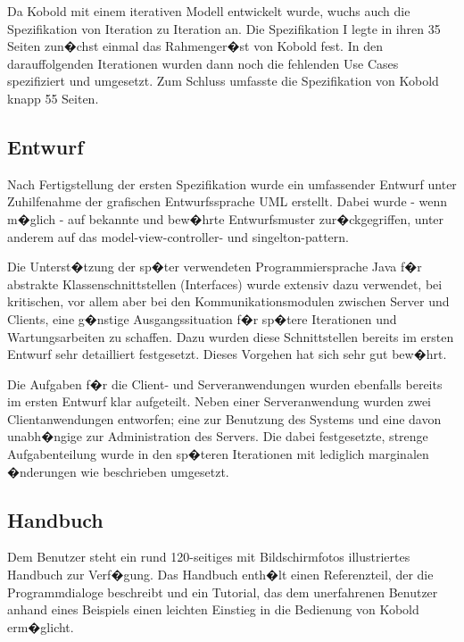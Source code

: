 \documentclass[a4paper,titlepage,12pt,ngerman]{scrbook}
\begin{document}
Da Kobold mit einem iterativen Modell entwickelt wurde, wuchs auch die Spezifikation 
von Iteration zu Iteration an. Die Spezifikation I legte in ihren 35 Seiten zun�chst 
einmal das Rahmenger�st von Kobold fest. In den darauffolgenden Iterationen wurden 
dann noch die fehlenden Use Cases spezifiziert und umgesetzt. Zum Schluss umfasste 
die Spezifikation von Kobold knapp 55 Seiten.

\subsection{Entwurf}

Nach Fertigstellung der ersten Spezifikation wurde ein umfassender Entwurf unter
Zuhilfenahme der grafischen Entwurfssprache UML erstellt. Dabei wurde - wenn
m�glich - auf bekannte und bew�hrte Entwurfsmuster zur�ckgegriffen, unter anderem
auf das model-view-controller- und singelton-pattern.\par

Die Unterst�tzung der sp�ter verwendeten Programmiersprache Java f�r abstrakte
Klassenschnittstellen (Interfaces) wurde extensiv dazu verwendet, bei kritischen, vor
allem aber bei den Kommunikationsmodulen zwischen Server und Clients, eine g�nstige
Ausgangssituation f�r sp�tere Iterationen und Wartungsarbeiten zu schaffen. Dazu wurden
diese Schnittstellen bereits im ersten Entwurf sehr detailliert festgesetzt. Dieses
Vorgehen hat sich sehr gut bew�hrt.\par

Die Aufgaben f�r die Client- und Serveranwendungen wurden ebenfalls bereits im ersten
Entwurf klar aufgeteilt. Neben einer Serveranwendung wurden zwei Clientanwendungen
entworfen; eine zur Benutzung des Systems und eine davon unabh�ngige zur Administration
des Servers. Die dabei festgesetzte, strenge Aufgabenteilung wurde in den sp�teren
Iterationen mit lediglich marginalen �nderungen wie beschrieben umgesetzt.

\subsection{Handbuch}
\label{handbuch}

Dem Benutzer steht ein rund 120-seitiges mit Bildschirmfotos illustriertes
Handbuch zur Verf�gung. Das Handbuch enth�lt einen Referenzteil, der
die Programmdialoge beschreibt und ein Tutorial, das dem
unerfahrenen Benutzer anhand eines Beispiels einen leichten Einstieg
in die Bedienung von Kobold erm�glicht.\par
\end{document}
